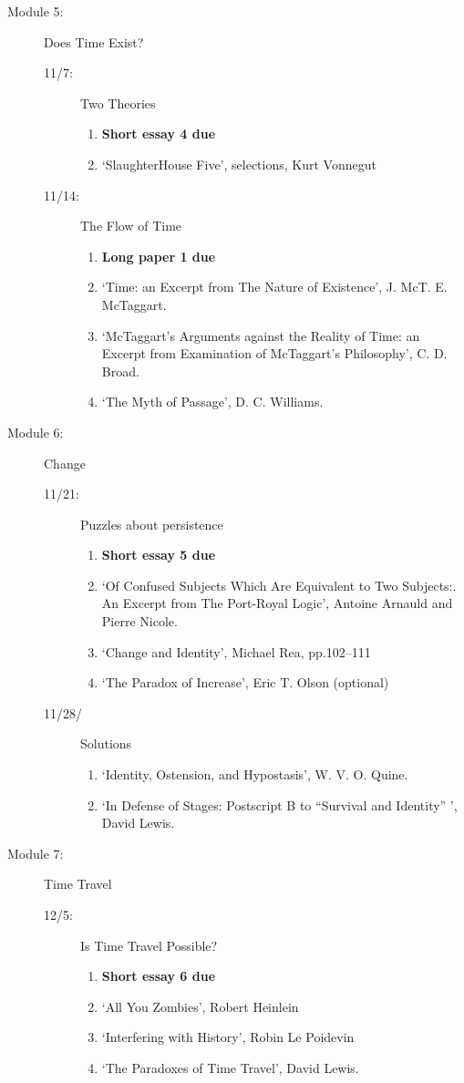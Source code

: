 \documentclass[article,oneside]{memoir}
\begin{document}
\begin{description}
\begin{description}
\begin{description}
\item[Module 5:] Does Time Exist? 
\begin{description}
\item [11/7:] Two Theories
\begin{enumerate}
\item \textbf{Short essay 4 due}
\item `SlaughterHouse Five', selections, Kurt Vonnegut
\end{enumerate}

\item[11/14:] The Flow of Time
\begin{enumerate}
\item \textbf{Long paper 1 due}
\item `Time: an Excerpt from The Nature of Existence', J. McT. E. McTaggart.
\item `McTaggart’s Arguments against the Reality of Time: an Excerpt from Examination of McTaggart’s Philosophy', C. D. Broad.
\item `The Myth of Passage', D. C. Williams.
\end{enumerate}
\end{description}

\item[Module 6:] Change
\begin{description}
\item[11/21:] Puzzles about persistence
\begin{enumerate}
\item \textbf{Short essay 5 due}
\item `Of Confused Subjects Which Are Equivalent to Two Subjects:. An Excerpt from The Port-Royal Logic', Antoine Arnauld and Pierre Nicole. 
\item `Change and Identity', Michael Rea, pp.102--111 
\item `The Paradox of Increase', Eric T. Olson (optional)
\end{enumerate}
\item[11/28/] Solutions
\begin{enumerate}
 \item `Identity, Ostension, and Hypostasis', W. V. O. Quine.
\item `In Defense of Stages: Postscript B to ``Survival and Identity'' ', David Lewis.
\end{enumerate}
\end{description}

\item[Module 7:] Time Travel
\begin{description}
\item[12/5:] Is Time Travel Possible?
\begin{enumerate}
\item \textbf{Short essay 6 due}
\item `All You Zombies', Robert Heinlein 
\item `Interfering with History', Robin Le Poidevin 
\item `The Paradoxes of Time Travel', David Lewis.


\end{enumerate}
\end{description}
\end{description}
\end{description}
\end{description}
\end{document}
